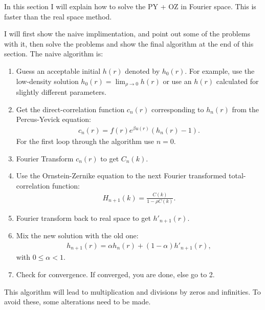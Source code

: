 
In this section I will explain how to solve the PY + OZ 
in Fourier space.
This is faster than the real space method.

I will first show the naive implimentation, and point out some of the problems with it, then solve the problems and
show the final algorithm at the end of this section.
The naive algorithm is:
\begin{enumerate}
\item Guess an acceptable initial $h(r)$ denoted by $h_0(r)$.
 For example, use the low-density solution $h_0(r) = \lim_{\rho \to 0} h(r)$ or use an  $h(r)$ calculated for slightly different parameters.
\item Get the direct-correlation function $c_n(r)$ corresponding to $h_n(r)$ from the Percus-Yevick equation:
\begin{align}
c_n(r) = f(r)e^{\beta u(r)} \left( h_n(r) - 1\right).
\end{align}
For the first loop through the algorithm use $n=0$.
\item Fourier Transform $c_n(r)$ to get $C_n(k)$.
\item Use the Ornstein-Zernike equation to the next Fourier transformed total-correlation function:
\begin{align}
H_{n+1}(k) = \frac{C(k)}{1-\rho C(k)}.
\end{align}
\item Fourier transform back to real space to get $h'_{n+1}(r)$.
\item Mix the new solution with the old one:
\begin{align}
h_{n+1}(r) = \alpha h_n(r) + (1-\alpha) h'_{n+1}(r),
\end{align}
with $0\leq \alpha < 1$.
\item Check for convergence. If converged, you are done, else go to 2.
\end{enumerate}

This algorithm will lead to multiplication and divisions by zeros and infinities.
To avoid these, some alterations need to be made.

